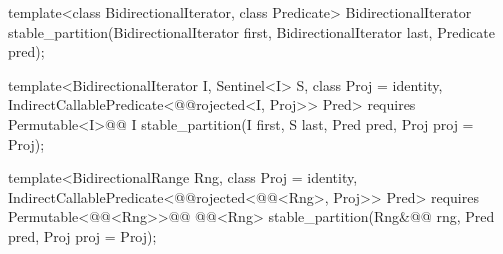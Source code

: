 %
\begin{removedblock}
\begin{itemdecl}
template<class BidirectionalIterator, class Predicate>
  BidirectionalIterator
    stable_partition(BidirectionalIterator first,
                     BidirectionalIterator last, Predicate pred);
\end{itemdecl}
\end{removedblock}
\begin{addedblock}
\begin{itemdecl}
template<BidirectionalIterator I, Sentinel<I> S, class Proj = identity,
    IndirectCallablePredicate<@@rojected<I, Proj>> Pred>
  requires Permutable<I>@\newtxt{()}@
  I stable_partition(I first, S last, Pred pred, Proj proj = Proj{});

template<BidirectionalRange Rng, class Proj = identity,
    IndirectCallablePredicate<@@rojected<@@<Rng>, Proj>> Pred>
  requires Permutable<@@<Rng>>@\newtxt{()}@
  @@<Rng>
    stable_partition(Rng&@\newtxt{\&}@ rng, Pred pred, Proj proj = Proj{});
\end{itemdecl}
\end{addedblock}

